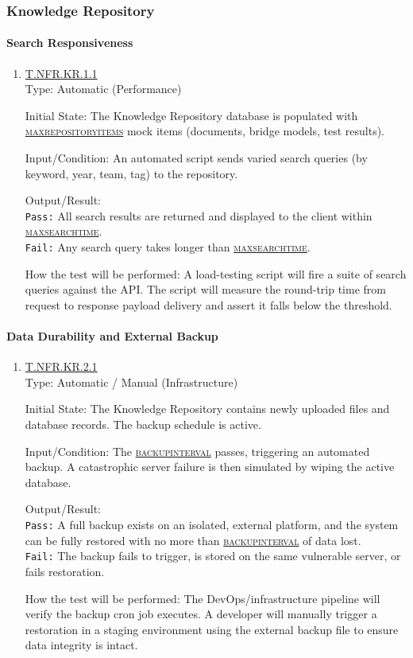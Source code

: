\documentclass[12pt, titlepage]{article}
\newcommand{\testdef}[1]{\leavevmode\hypertarget{test:#1}{}\hyperlink{trace:#1}{#1}}
\DeclareRobustCommand{\cname}[1]{{\renewcommand{\_}{\textunderscore\allowbreak}\textsc{#1}}}
\newcommand{\constfirst}[1]{\leavevmode\hypertarget{constfirst:\detokenize{#1}}{}\hyperlink{const:\detokenize{#1}}{\cname{#1}}}
\newcommand{\const}[1]{\hyperlink{const:\detokenize{#1}}{\cname{#1}}}
\begin{document}
\subsubsection{Knowledge Repository}

\paragraph{Search Responsiveness}
\begin{enumerate}
  \item \testdef{T.NFR.KR.1.1}\\
  Type: Automatic (Performance)

  Initial State: The Knowledge Repository database is populated with \constfirst{max\_repository\_items} mock items (documents, bridge models, test results).

  Input/Condition: An automated script sends varied search queries (by keyword, year, team, tag) to the repository.

  Output/Result: \\
  \texttt{Pass:} All search results are returned and displayed to the client within \constfirst{max\_search\_time}.\\
  \texttt{Fail:} Any search query takes longer than \const{max\_search\_time}.

  How the test will be performed: A load-testing script will fire a suite of search queries against the API. The script will measure the round-trip time from request to response payload delivery and assert it falls below the threshold.
\end{enumerate}

\paragraph{Data Durability and External Backup}
\begin{enumerate}
  \item \testdef{T.NFR.KR.2.1}\\
  Type: Automatic / Manual (Infrastructure)

  Initial State: The Knowledge Repository contains newly uploaded files and database records. The backup schedule is active.

  Input/Condition: The \constfirst{backup\_interval} passes, triggering an automated backup. A catastrophic server failure is then simulated by wiping the active database.

  Output/Result: \\
  \texttt{Pass:} A full backup exists on an isolated, external platform, and the system can be fully restored with no more than \const{backup\_interval} of data lost.\\
  \texttt{Fail:} The backup fails to trigger, is stored on the same vulnerable server, or fails restoration.

  How the test will be performed: The DevOps/infrastructure pipeline will verify the backup cron job executes. A developer will manually trigger a restoration in a staging environment using the external backup file to ensure data integrity is intact.
\end{enumerate}
\end{document}
